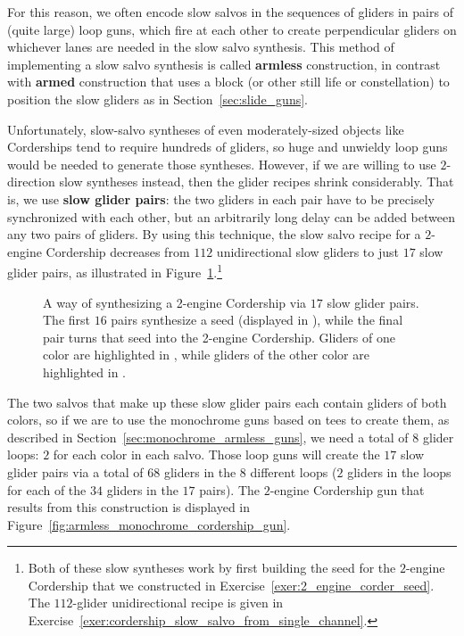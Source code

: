 For this reason, we often encode slow salvos in the sequences of gliders in pairs of (quite large) loop guns, which fire at each other to create perpendicular gliders on whichever lanes are needed in the slow salvo synthesis. This method of implementing a slow salvo synthesis is called \textbf{armless} construction, in contrast with \textbf{armed} construction that uses a block (or other still life or constellation) to position the slow gliders as in Section~\ref{sec:slide_guns}.

Unfortunately, slow-salvo syntheses of even moderately-sized objects like Corderships tend to require hundreds of gliders, so huge and unwieldy loop guns would be needed to generate those syntheses. However, if we are willing to use $2$-direction slow syntheses instead, then the glider recipes shrink considerably. That is, we use \textbf{slow glider pairs}: the two gliders in each pair have to be precisely synchronized with each other, but an arbitrarily long delay can be added between any two pairs of gliders. By using this technique, the slow salvo recipe for a $2$-engine Cordership decreases from $112$ unidirectional slow gliders to just $17$ slow glider pairs, as illustrated in Figure~\ref{fig:2_engine_cordership_slow_pair_synthesis}.\footnote{Both of these slow syntheses work by first building the seed for the $2$-engine Cordership that we constructed in Exercise~\ref{exer:2_engine_corder_seed}. The $112$-glider unidirectional recipe is given in Exercise~\ref{exer:cordership_slow_salvo_from_single_channel}.}

\begin{figure}[!htb]
	\centering
	\caption{A way of synthesizing a 2-engine Cordership via $17$ slow glider pairs. The first $16$ pairs synthesize a seed (displayed in ), while the final pair turns that seed into the 2-engine Cordership. Gliders of one color are highlighted in 
	, while gliders of the other color are highlighted in .}\label{fig:2_engine_cordership_slow_pair_synthesis}
\end{figure}

The two salvos that make up these slow glider pairs each contain gliders of both colors, so if we are to use the monochrome guns based on tees to create them, as described in Section~\ref{sec:monochrome_armless_guns}, we need a total of $8$ glider loops: $2$ for each color in each salvo. Those loop guns will create the $17$ slow glider pairs via a total of $68$ gliders in the $8$ different loops ($2$ gliders in the loops for each of the $34$ gliders in the $17$ pairs). The $2$-engine Cordership gun that results from this construction is displayed in Figure~\ref{fig:armless_monochrome_cordership_gun}.

